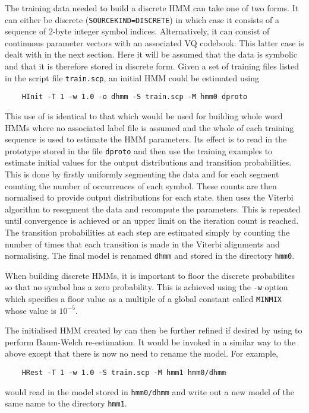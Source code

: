 The training data needed to build a discrete HMM can take one of two forms. It
can either be discrete (\texttt{SOURCEKIND=DISCRETE}) in which case it consists
of a sequence of 2-byte integer symbol indices.  Alternatively, it can consist
of continuous parameter vectors with an associated VQ codebook.  This latter
case is dealt with in the next section.  Here it will be assumed that the data
is symbolic and that it is therefore stored in discrete form. Given a set of training files listed in the script file
\texttt{train.scp}, an initial HMM could be estimated using
\begin{verbatim}
    HInit -T 1 -w 1.0 -o dhmm -S train.scp -M hmm0 dproto
\end{verbatim}
This use of  is identical to that which would be
used for building whole word HMMs where no associated label file is
assumed and the whole of each training sequence is used to estimate
the HMM parameters.  Its effect is to read in the prototype
stored in the file \texttt{dproto} and then use the training examples
to estimate initial values for the output distributions
and transition probabilities.  This is done by firstly uniformly 
segmenting the data and for each segment counting the number of occurrences
of each symbol.  These counts are then normalised to provide output distributions
for each state.   then uses the Viterbi algorithm to resegment
the data and recompute the parameters.  This is repeated until convergence
is achieved or an upper limit on the iteration count is reached.
The transition probabilities at each step are estimated simply by
counting the number of times that each transition is made in the Viterbi alignments
and normalising.  The final model is renamed \texttt{dhmm} and stored in
the directory \texttt{hmm0}.

When building discrete HMMs, it is important to floor the discrete
probabilites so that no symbol has a zero probability.  This is 
achieved using the \texttt{-w} option which specifies a floor value
as a multiple of a global constant called \texttt{MINMIX} whose
value is $10^{-5}$. 

The initialised HMM created by  
can then be further refined if desired by using 
to perform Baum-Welch re-estimation.  It would be invoked in a similar
way to the above except that there is now no need to rename the model.
For example,
\begin{verbatim}
    HRest -T 1 -w 1.0 -S train.scp -M hmm1 hmm0/dhmm
\end{verbatim}
would read in the model stored in \texttt{hmm0/dhmm} and write out a new
model of the same name to the directory \texttt{hmm1}.

